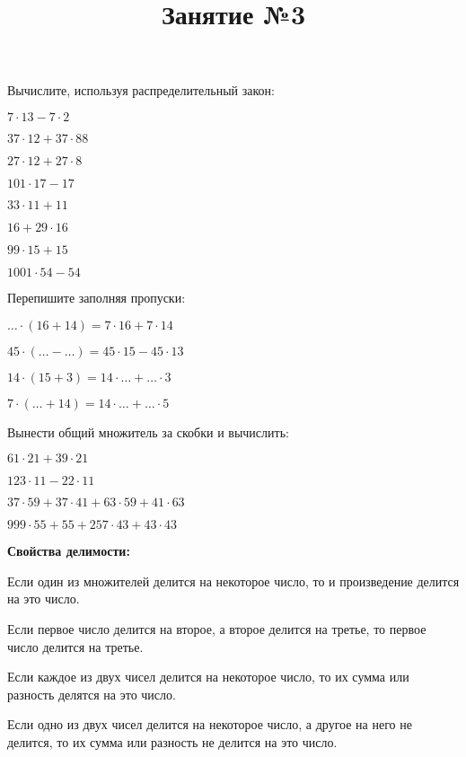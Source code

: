 \title{Занятие №3}
\begin{listofex}
	\item Вычислите, используя распределительный закон:
	\begin{enumcols}[itemcolumns=4]
		\item \( 7\cdot13-7\cdot2 \)
		\item \( 37\cdot12+37\cdot88 \)
		\item \( 27\cdot12+27\cdot8 \)
		\item \( 101\cdot17-17 \)
		\item \( 33\cdot11+11 \)
		\item \( 16+29\cdot16 \)
		\item \( 99\cdot15+15 \)
		\item \( 1001\cdot54-54 \)
	\end{enumcols}
	\item Перепишите заполняя пропуски:
	\begin{enumcols}[itemcolumns=2]
		\item \( {\dots}\cdot(16+14)=7\cdot16+7\cdot14 \)
		\item \( 45\cdot({\dots}-{\dots})=45\cdot15-45\cdot13 \)
		\item \( 14\cdot(15+3)=14\cdot{\dots}+{\dots}\cdot3 \)
		\item \( 7\cdot({\dots}+14)=14\cdot{\dots}+{\dots}\cdot5 \)
	\end{enumcols}
	\item Вынести общий множитель за скобки и вычислить:
	\begin{enumcols}[itemcolumns=2]
		\item \( 61\cdot21+39\cdot21 \)
		\item \( 123\cdot11-22\cdot11 \)
		\item \( 37\cdot59+37\cdot41+63\cdot59+41\cdot63 \)
		\item \( 999\cdot55+55+257\cdot43+43\cdot43 \)
	\end{enumcols}
	\item \textbf{Свойства делимости:}
	\begin{enumcols}[itemcolumns=1]
		\item Если один из множителей делится на некоторое число, то и произведение делится на это число.
		\item Если первое число делится на второе, а второе делится на третье, то первое число делится на третье.
		\item Если каждое из двух чисел делится на некоторое число, то их сумма или разность делятся на это число.
		\item Если одно из двух чисел делится на некоторое число, а другое на него не делится, то их сумма или разность не делится на это число.

\end{enumcols}
\end{listofex}
